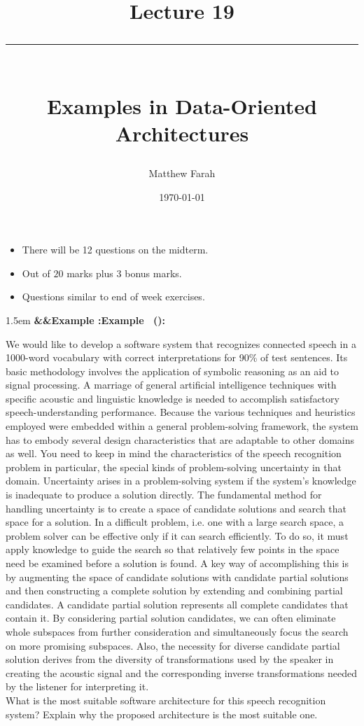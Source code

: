 \documentclass{article}
\date{
	\vspace{-.75em}
	{\large \today}
}
\title{
	\vspace*{-1.5em}
	{\Huge Lecture 19} \\
	\vspace{-1em}
	\rule{\textwidth/4}{.01em} \\
	\vspace{-.25em}
	{\Large Examples in Data-Oriented Architectures}
	\vspace{-.75em}
}
\author{
	{\large Matthew Farah}
}
\newcounter{example}
\renewcommand{\theexample}{\arabic{example}}
\newenvironment{example}[1][]{
	\refstepcounter{example}
	\begin{adjustwidth}{1.5em}{}
	\noindent\textbf{\ifx&#1&Example \theexample:\else Example \theexample \ (#1):\fi}
	\ignorespaces
}{
	\vspace{.5em}
	\end{adjustwidth}
}
\begin{document}
\maketitle
\pagestyle{fancy}

\fi

\begin{itemize}
	\item There will be 12 questions on the midterm.
	\item Out of $20$ marks plus 3 bonus marks.
	\item Questions similar to end of week exercises.
\end{itemize}

\begin{example}
	We would like to develop a software system that recognizes connected speech in a
	1000-word vocabulary with correct interpretations for 90\% of test sentences. Its basic methodology
	involves the application of symbolic reasoning as an aid to signal processing. A marriage of general
	artificial intelligence techniques with specific acoustic and linguistic knowledge is needed to accomplish
	satisfactory speech-understanding performance. Because the various techniques and heuristics employed
	were embedded within a general problem-solving framework, the system has to embody several design
	characteristics that are adaptable to other domains as well. You need to keep in mind the characteristics
	of the speech recognition problem in particular, the special kinds of problem-solving uncertainty in that
	domain. Uncertainty arises in a problem-solving system if the system’s knowledge is inadequate to
	produce a solution directly. The fundamental method for handling uncertainty is to create a space
	of candidate solutions and search that space for a solution. In a difficult problem, i.e. one with a
	large search space, a problem solver can be effective only if it can search efficiently. To do so, it
	must apply knowledge to guide the search so that relatively few points in the space need be examined
	before a solution is found. A key way of accomplishing this is by augmenting the space of candidate
	solutions with candidate partial solutions and then constructing a complete solution by extending and
	combining partial candidates. A candidate partial solution represents all complete candidates that
	contain it. By considering partial solution candidates, we can often eliminate whole subspaces from
	further consideration and simultaneously focus the search on more promising subspaces. Also, the
	necessity for diverse candidate partial solution derives from the diversity of transformations used by
	the speaker in creating the acoustic signal and the corresponding inverse transformations needed by the
	listener for interpreting it. \\
	What is the most suitable software architecture for this speech recognition system? Explain why the
	proposed architecture is the most suitable one.
\end{example}
\end{document}
